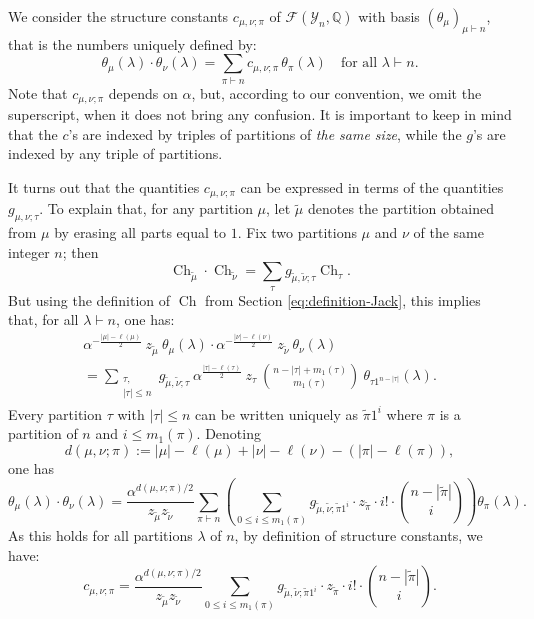 \documentclass[11pt]{amsart}
\theoremstyle{plain}
\theoremstyle{remark}
\newcommand{\F}{\mathcal{F}}
\newcommand{\QQ}{\mathbb{Q}}
\newcommand{\Young}{\mathcal{Y}}
\DeclareMathOperator{\Ch}{Ch}
\begin{document}
We consider the structure constants $c_{\mu,\nu;\pi}$ 
of $\F(\Young_n,\QQ)$ with basis $(\theta_\mu)_{\mu \vdash n}$,
that is the numbers uniquely defined by:
\begin{equation}\label{EqDefC}
\theta_\mu(\lambda) \cdot \theta_\nu(\lambda)
= \sum_{\pi \vdash n} c_{\mu,\nu;\pi} \, \theta_\pi(\lambda) \quad \text{for all $\lambda \vdash n$}.
\end{equation}
Note that $c_{\mu,\nu;\pi}$ depends on $\alpha$,
but, according to our convention, we omit the superscript,
when it does not bring any confusion.
It is important to keep in mind that the $c$'s are indexed by triples of partitions
of \emph{the same size}, while the $g$'s are indexed by any triple of partitions.

It turns out that the quantities $c_{\mu,\nu;\pi}$ can be expressed in terms of the quantities $g_{\mu,\nu;\tau}$.
To explain that, for any partition $\mu$, let $\tilde{\mu}$ denotes the partition
obtained from $\mu$ by erasing all parts equal to $1$.
Fix two partitions $\mu$ and $\nu$ of the same integer $n$; then
\[\Ch_{\tilde{\mu}} \cdot \Ch_{\tilde{\nu}} 
= \sum_\tau g_{\tilde{\mu},\tilde{\nu};\tau} \Ch_{\tau}. \]
But using the definition of $\Ch$ from Section \ref{eq:definition-Jack},
this implies that, for all $\lambda \vdash n$, one has:
\begin{multline*}
    \alpha^{-\frac{|\mu|-\ell(\mu)}{2}}\ z_{\tilde{\mu}}\ \theta_\mu(\lambda) \cdot
 \alpha^{-\frac{|\nu|-\ell(\nu)}{2}}\ z_{\tilde{\nu}}\ \theta_\nu(\lambda) \\
= \sum_{\substack{\tau, \\|\tau| \leq n}} g_{\tilde{\mu},\tilde{\nu};\tau}\ 
 \alpha^{\frac{|\tau|-\ell(\tau)}{2}}\ z_\tau\ \binom{n-|\tau|+m_1(\tau)}{m_1(\tau)}\
 \theta_{\tau 1^{n-|\tau|}}(\lambda).
 \end{multline*}
Every partition $\tau$ with $|\tau| \leq n$ can be written uniquely as $\tilde{\pi} 1^i$ where
$\pi$ is a partition of $n$ and $i \leq m_1(\pi)$.
Denoting 
$$d(\mu,\nu;\pi) := |\mu|-\ell(\mu) + |\nu|-\ell(\nu) - (|\pi| - \ell(\pi)),$$ 
one has
\[ \theta_\mu(\lambda) \cdot \theta_\nu(\lambda)
= \frac{\alpha^{d(\mu,\nu;\pi)/2}}{z_{\tilde{\mu}} z_{\tilde{\nu}}} \sum_{\pi \vdash n} 
\left( \sum_{0 \leq i \leq m_1(\pi)} g_{\tilde{\mu},\tilde{\nu};\tilde{\pi}
1^i}
\cdot z_{\tilde{\pi}} \cdot i! \cdot \binom{n-|\tilde{\pi}|}{i} \right) \theta_\pi(\lambda).\]
As this holds for all partitions $\lambda$ of $n$, 
by definition of structure constants, we have:
\begin{equation}\label{EqCG}
    c_{\mu,\nu;\pi} = \frac{\alpha^{d(\mu,\nu;\pi)/2}}{z_{\tilde{\mu}} z_{\tilde{\nu}}} 
\sum_{0 \leq i \leq m_1(\pi)} g_{\tilde{\mu},\tilde{\nu};\tilde{\pi} 1^i}    
\cdot z_{\tilde{\pi}} \cdot i! \cdot \binom{n-|\tilde{\pi}|}{i}.
\end{equation}
\end{document}
